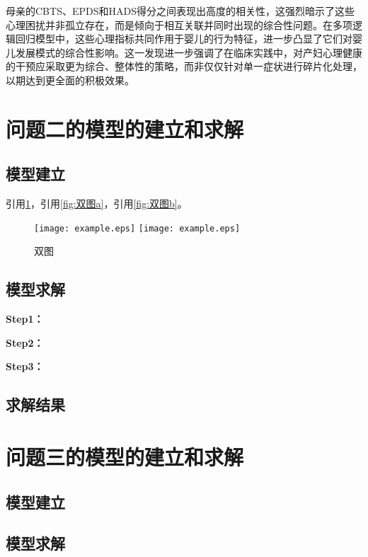 \documentclass[withoutpreface,bwprint]{cumcmthesis}
\begin{document}
母亲的CBTS、EPDS和HADS得分之间表现出高度的相关性，这强烈暗示了这些心理困扰并非孤立存在，而是倾向于相互关联并同时出现的综合性问题。在多项逻辑回归模型中，这些心理指标共同作用于婴儿的行为特征，进一步凸显了它们对婴儿发展模式的综合性影响。这一发现进一步强调了在临床实践中，对产妇心理健康的干预应采取更为综合、整体性的策略，而非仅仅针对单一症状进行碎片化处理，以期达到更全面的积极效果。



\section{问题二的模型的建立和求解}
\subsection{模型建立}

引用\cref{fig:双图}，引用\cref{fig:双图a}，引用\cref{fig:双图b}。

\begin{figure}[ht]
\centering
{}
{\texttt{[image: example.eps]}}
{\texttt{[image: example.eps]}}
\caption{双图}\label{fig:双图}
\end{figure} 

\subsection{模型求解}

\textbf{Step1：} 

\textbf{Step2：} 

\textbf{Step3：} 

\subsection{求解结果}


\section{问题三的模型的建立和求解}
\subsection{模型建立}

\subsection{模型求解}
\end{document}
